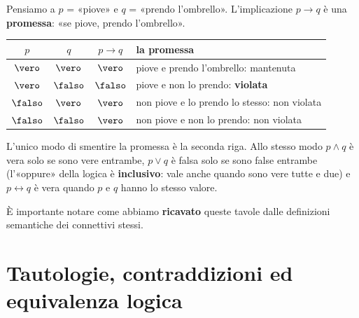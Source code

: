 \begin{spiegazione}
    Pensiamo a $p$ = «piove» e $q$ = «prendo l'ombrello». L'implicazione $p \rightarrow q$ è una \textbf{promessa}: «se piove, prendo l'ombrello».
    \begin{center}
    \renewcommand{\arraystretch}{1.2}
    \begin{tabular}{cc|c|l}
        $p$ & $q$ & $p \rightarrow q$ & la promessa \\ \hline
        $\vero$ & $\vero$ & $\vero$ & piove e prendo l'ombrello: mantenuta \\
        $\vero$ & $\falso$ & $\falso$ & piove e non lo prendo: \textbf{violata} \\
        $\falso$ & $\vero$ & $\vero$ & non piove e lo prendo lo stesso: non violata \\
        $\falso$ & $\falso$ & $\vero$ & non piove e non lo prendo: non violata \\
    \end{tabular}
    \end{center}
    L'unico modo di smentire la promessa è la seconda riga. Allo stesso modo $p \wedge q$ è vera solo se sono vere entrambe, $p \vee q$ è falsa solo
    se sono false entrambe (l'«oppure» della logica è \textbf{inclusivo}: vale anche quando sono vere tutte e due) e $p \leftrightarrow q$ è vera quando
    $p$ e $q$ hanno lo stesso valore.
\end{spiegazione}


È importante notare come abbiamo \textbf{ricavato} queste tavole dalle definizioni semantiche dei connettivi stessi.


\section{Tautologie, contraddizioni ed equivalenza logica}\label{sec:tautologie}


